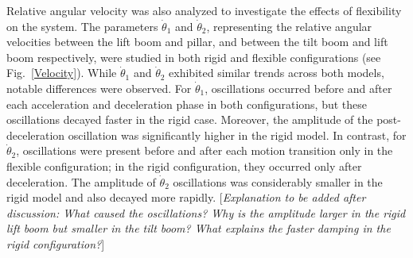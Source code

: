 Relative angular velocity was also analyzed to investigate the effects of flexibility on the system. The parameters $\dot{\theta}_1$ and $\dot{\theta}_2$, representing the relative angular velocities between the lift boom and pillar, and between the tilt boom and lift boom respectively, were studied in both rigid and flexible configurations (see Fig.~\ref{Velocity}). While $\dot{\theta}_1$ and $\dot{\theta}_2$ exhibited similar trends across both models, notable differences were observed. For $\dot{\theta}_1$, oscillations occurred before and after each acceleration and deceleration phase in both configurations, but these oscillations decayed faster in the rigid case. Moreover, the amplitude of the post-deceleration oscillation was significantly higher in the rigid model. In contrast, for $\dot{\theta}_2$, oscillations were present before and after each motion transition only in the flexible configuration; in the rigid configuration, they occurred only after deceleration. The amplitude of $\dot{\theta}_2$ oscillations was considerably smaller in the rigid model and also decayed more rapidly.
[\textit{Explanation to be added after discussion: What caused the oscillations? Why is the amplitude larger in the rigid lift boom but smaller in the tilt boom? What explains the faster damping in the rigid configuration?}]

